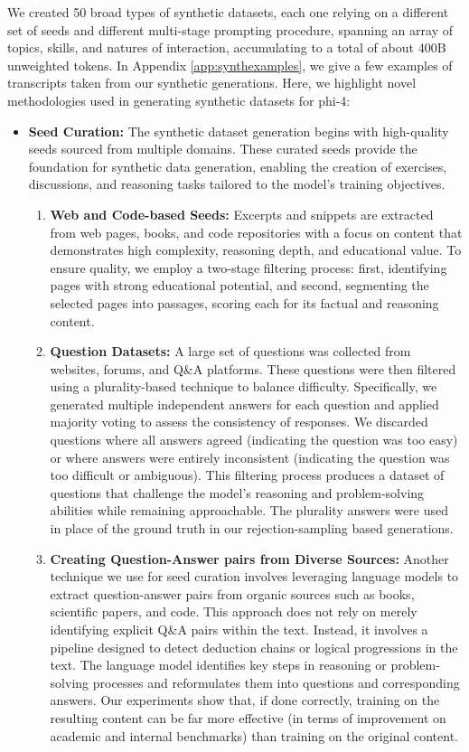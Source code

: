 \documentclass[11pt]{article}
\newcommand{\modelwithoutspace}{\textsf{phi-4}}
\begin{document}
We created 50 broad types of synthetic datasets, each one relying on a different set of seeds and different multi-stage prompting procedure, spanning an array of topics, skills, and natures of interaction, accumulating to a total of about 400B unweighted tokens. In Appendix \ref{app:synthexamples}, we give a few examples of transcripts taken from our synthetic generations.
Here, we highlight novel methodologies used in generating synthetic datasets for \modelwithoutspace:
\begin{itemize}
\item \textbf{Seed Curation:} The synthetic dataset generation begins with high-quality seeds sourced from multiple domains.  These curated seeds provide the foundation for synthetic data generation, enabling the creation of exercises, discussions, and reasoning tasks tailored to the model's training objectives.
\begin{enumerate}
    \item \textbf{Web and Code-based Seeds:} Excerpts and snippets are extracted from web pages, books, and code repositories with a focus on content that demonstrates high complexity, reasoning depth, and educational value. To ensure quality, we employ a two-stage filtering process: first, identifying pages with strong educational potential, and second, segmenting the selected pages into passages, scoring each for its factual and reasoning content.
    \item \textbf{Question Datasets:} A large set of questions was collected from websites, forums, and Q\&A platforms. These questions were then filtered using a plurality-based technique to balance difficulty. Specifically, we generated multiple independent answers for each question and applied majority voting to assess the consistency of responses. We discarded questions where all answers agreed (indicating the question was too easy) or where answers were entirely inconsistent (indicating the question was too difficult or ambiguous). This filtering process produces a dataset of questions that challenge the model's reasoning and problem-solving abilities while remaining approachable. The plurality answers were used in place of the ground truth in our rejection-sampling based generations. 
    \item \textbf{Creating Question-Answer pairs from Diverse Sources:} Another technique we use for seed curation involves leveraging language models to extract question-answer pairs from organic sources such as books, scientific papers, and code. This approach does not rely on merely identifying explicit Q\&A pairs within the text. Instead, it involves a pipeline designed to detect deduction chains or logical progressions in the text. The language model identifies key steps in reasoning or problem-solving processes and reformulates them into questions and corresponding answers. Our experiments show that, if done correctly, training on the resulting content can be far more effective (in terms of improvement on academic and internal benchmarks) than training on the original content. 

\end{enumerate}
\end{itemize}
\end{document}
